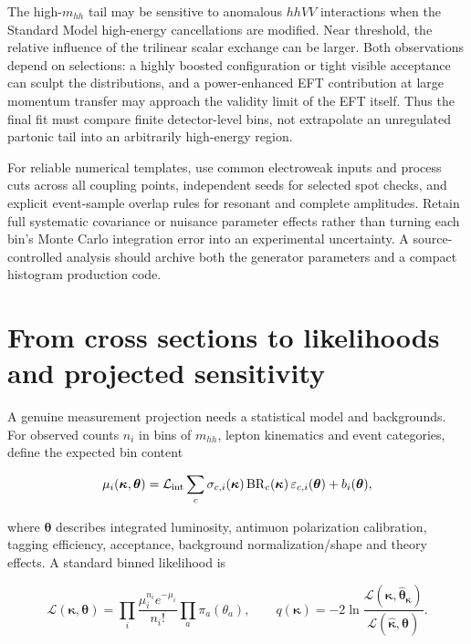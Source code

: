 \documentclass[12pt,a4paper]{article}
\newcommand{\newnote}{\clearpage}
\newcommand{\eps}{\varepsilon}
\newcommand{\Lumi}{\mathcal{L}}
\begin{document}
The high-$m_{hh}$ tail may be sensitive to anomalous $hhVV$ interactions when the Standard Model high-energy cancellations are modified. Near threshold, the relative influence of the trilinear scalar exchange can be larger. Both observations depend on selections: a highly boosted configuration or tight visible acceptance can sculpt the distributions, and a power-enhanced EFT contribution at large momentum transfer may approach the validity limit of the EFT itself. Thus the final fit must compare finite detector-level bins, not extrapolate an unregulated partonic tail into an arbitrarily high-energy region.

For reliable numerical templates, use common electroweak inputs and process cuts across all coupling points, independent seeds for selected spot checks, and explicit event-sample overlap rules for resonant and complete amplitudes. Retain full systematic covariance or nuisance parameter effects rather than turning each bin's Monte Carlo integration error into an experimental uncertainty. A source-controlled analysis should archive both the generator parameters and a compact histogram production code.




\newnote

\section{From cross sections to likelihoods and projected sensitivity}
A genuine measurement projection needs a statistical model and backgrounds. For observed counts $n_i$ in bins of $m_{hh}$, lepton kinematics and event categories, define the expected bin content

\begin{equation}
\mu_i(\bm\kappa,\bm\theta)=\Lumi_{\rm int}
 \sum_c\sigma_{c,i}(\bm\kappa)\,
 \mathrm{BR}_c(\bm\kappa)\,\eps_{c,i}(\bm\theta)
 +b_i(\bm\theta),
\end{equation}

where $\bm\theta$ describes integrated luminosity, antimuon polarization calibration, tagging efficiency, acceptance, background normalization/shape and theory effects. A standard binned likelihood is

\begin{equation}
\label{eq:likelihood}
\mathcal L(\bm\kappa,\bm\theta)
=\prod_i\frac{\mu_i^{n_i}e^{-\mu_i}}{n_i!}
\prod_a\pi_a(\theta_a),\qquad
q(\bm\kappa)=-2\ln\frac{\mathcal L(\bm\kappa,\hat{\bm\theta}_{\bm\kappa})}
{\mathcal L(\hat{\bm\kappa},\hat{\bm\theta})}.
\end{equation}
\end{document}
